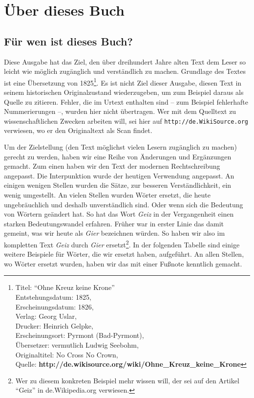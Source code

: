 

\part{Über dieses Buch}


\chapter{Für wen ist dieses Buch?}

Diese Ausgabe hat das Ziel, den über dreihundert Jahre alten Text dem Leser
so leicht wie möglich zugänglich und verständlich zu machen. Grundlage
des Textes ist eine Übersetzung von 1825\footnote{
Titel: "`Ohne Kreuz keine Krone"' \\
Entstehungsdatum: 1825, \\
Erscheinungsdatum: 1826, \\
Verlag: Georg Uslar, \\
Drucker: Heinrich Gelpke, \\
Erscheinungsort: Pyrmont (Bad-Pyrmont),\\
Übersetzer: vermutlich Ludwig Seebohm, \\
Originaltitel: No Cross No Crown, \\
Quelle: \textbf{http://de.wikisource.org/wiki/Ohne\_Kreuz\_keine\_Krone}}. Es
ist nicht Ziel dieser Ausgabe, diesen Text in seinem historischen Originalzustand wiederzugeben, um zum Beispiel daraus als Quelle zu zitieren. Fehler, die im
Urtext enthalten sind -- zum Beispiel fehlerhafte Nummerierungen --, wurden hier nicht
übertragen. Wer mit dem Quelltext zu wissenschaftlichen Zwecken arbeiten will,
sei hier auf \texttt{http://de.WikiSource.org} verwiesen, wo er den
Originaltext als Scan findet.

\medskip

Um der Zielstellung (den Text möglichst vielen Lesern zugänglich zu machen)
gerecht zu werden, haben wir eine Reihe von Änderungen und Ergänzungen gemacht.
Zum einen haben wir den Text der modernen Rechtschreibung angepasst. Die
Interpunktion wurde der heutigen Verwendung angepasst. An einigen wenigen Stellen
wurden die Sätze, zur besseren Verständlichkeit, ein wenig umgestellt. An vielen
Stellen wurden Wörter ersetzt, die heute ungebräuchlich und deshalb
unverständlich sind. Oder wenn sich die Bedeutung von Wörtern geändert hat. So
hat das Wort \textit{Geiz} in der Vergangenheit einen starken Bedeutungswandel
erfahren. Früher war in erster Linie das damit gemeint, was wir heute als
\textit{Gier} bezeichnen würden. So haben wir also im kompletten Text
\textit{Geiz} durch \textit{Gier} ersetzt\footnote{Wer zu diesem konkreten
Beispiel mehr wissen will, der sei auf den Artikel "`Geiz"' in de.Wikipedia.org
verwiesen.}. In der folgenden Tabelle sind einige
weitere Beispiele für Wörter, die wir ersetzt haben, aufgeführt. An allen
Stellen, wo Wörter ersetzt wurden, haben wir das mit einer Fußnote kenntlich
gemacht.

